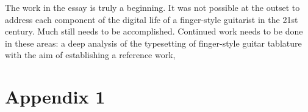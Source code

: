 \documentclass[unicode,hyperfootnotes=false,xetex,colorlinks=true,nofonts,nobib]{tufte-handout}
\begin{document}
The work in the essay is truly a beginning. It was not possible at the outset to address each component of the digital life of a finger-style guitarist in the 21st century. Much still needs to be accomplished. Continued work needs to be done in these areas: a deep analysis of the typesetting of finger-style guitar tablature with the aim of establishing a reference work, 

\nocite{alexAnderson,alexDeGrassi,andrewWhite,andyMcKee,billyMcLaughlin,adamRafferty,calumGraham,cliveCarroll,craigDAndrea,evaAtmatzidou,ewanDobson,garethPearson,happyTraum,ianEthanCase,janetFeder,jimmyWahlsteen,jonGomm,kakiKing,kellyValleau,kevinHorrigan,leoKottke,lucaStricagnoli,lucasMich,masaakiKishibe,michaelChap,michaelGul,mikeDawes,murielAnders,peppino,peterCiluzzi,peterFinger,pierre,rayMontford,pino,spencerElliot,sunghaJung,thomasLeeb,timSparks,tommyEmmanuel,trevorGH,vickiGenfan}
% 
% 
\printbibliography
\clearpage

\section{Appendix 1}
\label{sec:appendix-1}
\end{document}
